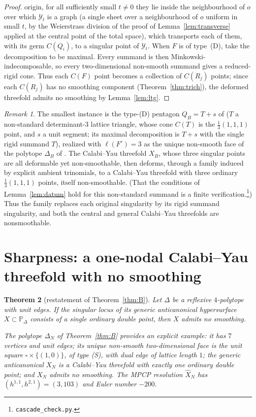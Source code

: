 \documentclass[11pt]{amsart}
\newtheorem{theorem}{Theorem}[section]
\theoremstyle{definition}
\theoremstyle{remark}
\newtheorem{remark}[theorem]{Remark}
\newcommand{\PP}{\mathbb{P}}
\begin{document}
\begin{proof}
origin, for all sufficiently small $t \neq 0$ they lie inside the
neighbourhood of $o$ over which
$\mathcal Y_t$ is a graph (a single sheet over a neighbourhood of $o$
uniform in small $t$, by the Weierstrass division of the proof of
Lemma~\ref{lem:transverse} applied at the central point of the total
space), which transports each of them, with its germ
$C(Q_i)$, to a singular point of $\mathcal Y_t$.
When $F$ is of type~(D), take the decomposition to be maximal.  Every
summand is then Minkowski-indecomposable, so every two-dimensional non-smooth
summand gives a reduced-rigid cone.  Thus each $C(F)$ point
becomes a collection of $C(R_j)$ points; since each $C(R_j)$ has no smoothing
component (Theorem~\ref{thm:trich}), the deformed
threefold admits no
smoothing by Lemma~\ref{lem:ltg}.
\end{proof}

\begin{remark}\label{rem:cascade-global}
The smallest instance is the type-\textup{(D)} pentagon $Q_B = T + s$ of \cite{paper1}
($T$ a non-standard determinant-$3$ lattice triangle, whose cone $C(T)$
is the $\frac13(1,1,1)$ point,
and $s$ a unit segment; its maximal decomposition is $T + s$
with the single rigid summand $T$), realized with $\ell(F^\circ) = 3$ as the unique
non-smooth face of the polytope $\Delta_B$ of \cite{paper1}.  The Calabi--Yau
threefold $X_B$, whose three singular points are all deformable yet
non-smoothable, then deforms, through a family induced by explicit ambient
trinomials, to a
Calabi--Yau threefold with three ordinary $\frac13(1,1,1)$ points, itself
non-smoothable.  (That the conditions of Lemma~\ref{lem:datum} hold for this
non-standard summand is a finite
verification.\footnote{\texttt{cascade\_check.py}.})  Thus the family
replaces each original singularity by its rigid summand singularity,
and both the central and general Calabi--Yau threefolds are nonsmoothable.
\end{remark}

\section{Sharpness: a one-nodal Calabi--Yau threefold with no smoothing}
\label{sec:node}

\begin{theorem}[restatement of Theorem~\textup{\ref{thm:B}}]\label{thm:B2}
Let $\Delta$ be a reflexive $4$-polytope with unit edges.  If the singular
locus of its generic anticanonical hypersurface $X\subset\PP_\Delta$
consists of a single ordinary double point, then $X$ admits no smoothing.

The polytope $\Delta_N$ of Theorem~\textup{\ref{thm:B}} provides an explicit
example: it has $7$ vertices and unit
edges; its unique non-smooth two-dimensional face is the unit square
$\square\times\{(1,0)\}$, of type \textup{(S)}, with dual edge of
lattice length $1$; the generic anticanonical $X_N$ is a Calabi--Yau
threefold with exactly one ordinary double point; and $X_N$ admits no
smoothing.  The MPCP resolution
$\widehat X_N$ has $(h^{1,1}, h^{2,1}) = (3, 103)$ and Euler number
$-200$.
\end{theorem}
\end{document}
